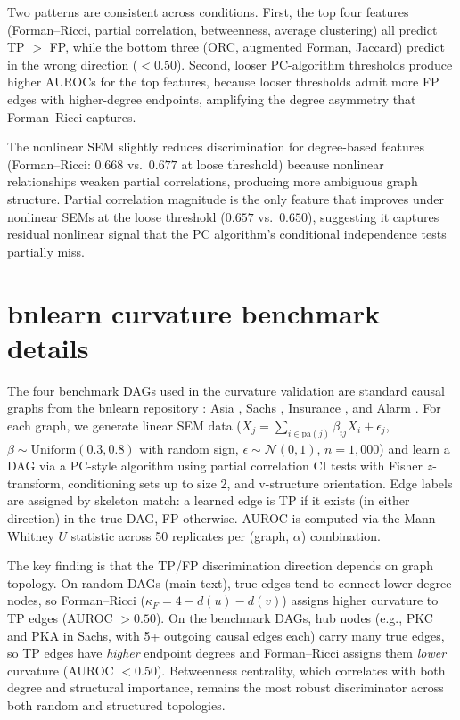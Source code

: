 \documentclass[11pt]{article}
\begin{document}
Two patterns are consistent across conditions. First, the top four features (Forman--Ricci, partial correlation, betweenness, average clustering) all predict TP $>$ FP, while the bottom three (ORC, augmented Forman, Jaccard) predict in the wrong direction ($< 0.50$). Second, looser PC-algorithm thresholds produce higher AUROCs for the top features, because looser thresholds admit more FP edges with higher-degree endpoints, amplifying the degree asymmetry that Forman--Ricci captures.

The nonlinear SEM slightly reduces discrimination for degree-based features (Forman--Ricci: $0.668$ vs.\ $0.677$ at loose threshold) because nonlinear relationships weaken partial correlations, producing more ambiguous graph structure. Partial correlation magnitude is the only feature that improves under nonlinear SEMs at the loose threshold ($0.657$ vs.\ $0.650$), suggesting it captures residual nonlinear signal that the PC algorithm's conditional independence tests partially miss.

\section{bnlearn curvature benchmark details}
\label{app:bnlearn}

The four benchmark DAGs used in the curvature validation are standard causal graphs from the bnlearn repository \citep{scutari2010learning}: Asia \citep{lauritzen1988local}, Sachs \citep{sachs2005causal}, Insurance \citep{binder1997adaptive}, and Alarm \citep{beinlich1989alarm}. For each graph, we generate linear SEM data ($X_j = \sum_{i \in \mathrm{pa}(j)} \beta_{ij} X_i + \epsilon_j$, $\beta \sim \mathrm{Uniform}(0.3, 0.8)$ with random sign, $\epsilon \sim \mathcal{N}(0,1)$, $n = 1{,}000$) and learn a DAG via a PC-style algorithm using partial correlation CI tests with Fisher $z$-transform, conditioning sets up to size 2, and v-structure orientation. Edge labels are assigned by skeleton match: a learned edge is TP if it exists (in either direction) in the true DAG, FP otherwise. AUROC is computed via the Mann--Whitney $U$ statistic across 50 replicates per (graph, $\alpha$) combination.

The key finding is that the TP/FP discrimination direction depends on graph topology. On random DAGs (main text), true edges tend to connect lower-degree nodes, so Forman--Ricci ($\kappa_F = 4 - d(u) - d(v)$) assigns higher curvature to TP edges (AUROC $> 0.50$). On the benchmark DAGs, hub nodes (e.g., PKC and PKA in Sachs, with 5+ outgoing causal edges each) carry many true edges, so TP edges have \emph{higher} endpoint degrees and Forman--Ricci assigns them \emph{lower} curvature (AUROC $< 0.50$). Betweenness centrality, which correlates with both degree and structural importance, remains the most robust discriminator across both random and structured topologies.
\end{document}

